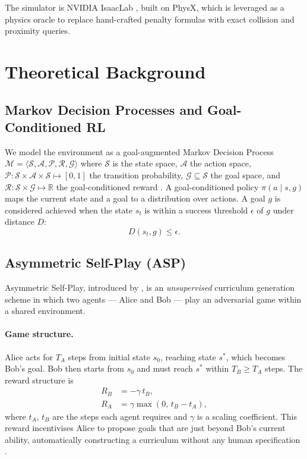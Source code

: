\documentclass[12pt, a4paper]{article}
\newcommand{\sstar}{s^{*}}
\newcommand{\RR}{\mathbb{R}}
\newcommand{\calG}{\mathcal{G}}
\newcommand{\calS}{\mathcal{S}}
\newcommand{\calA}{\mathcal{A}}
\begin{document}
The simulator is NVIDIA IsaacLab \cite{isaaclab2023}, built on PhysX, which is leveraged
as a physics oracle to replace hand-crafted penalty formulas with exact collision and
proximity queries.

\section{Theoretical Background}
\label{sec:background}

\subsection{Markov Decision Processes and Goal-Conditioned RL}
\label{subsec:mdp}

We model the environment as a goal-augmented Markov Decision Process
$\mathcal{M} = \langle \calS, \calA, \mathcal{P}, \mathcal{R}, \calG \rangle$
where $\calS$ is the state space, $\calA$ the action space,
$\mathcal{P}: \calS \times \calA \times \calS \mapsto [0,1]$ the transition probability,
$\calG \subseteq \calS$ the goal space, and
$\mathcal{R}: \calS \times \calG \mapsto \RR$ the goal-conditioned reward
\cite{kaelbling1993learning,plappert2021asymmetric}.
A goal-conditioned policy $\pi(a \mid s, g)$ maps the current state and a goal
to a distribution over actions. A goal $g$ is considered achieved when the state
$s_t$ is within a success threshold $\epsilon$ of $g$ under distance $D$:
\begin{equation}
    D(s_t, g) \leq \epsilon.
\end{equation}

\subsection{Asymmetric Self-Play (ASP)}
\label{subsec:asp}

Asymmetric Self-Play, introduced by \citet{sukhbaatar2018intrinsic}, is an
\emph{unsupervised} curriculum generation scheme in which two agents — Alice and Bob —
play an adversarial game within a shared environment.

\paragraph{Game structure.}
Alice acts for $T_A$ steps from initial state $s_0$, reaching state $\sstar$, which becomes
Bob's goal. Bob then starts from $s_0$ and must reach $\sstar$ within $T_B \geq T_A$ steps.
The reward structure is
\begin{align}
    R_B &= -\gamma\, t_B, \label{eq:rb_og}\\
    R_A &= \gamma \max(0,\, t_B - t_A), \label{eq:ra_og}
\end{align}
where $t_A$, $t_B$ are the steps each agent requires and $\gamma$ is a scaling coefficient.
This reward incentivises Alice to propose goals that are just beyond Bob's current ability,
automatically constructing a curriculum without any human specification
\cite{sukhbaatar2018intrinsic}.
\end{document}
